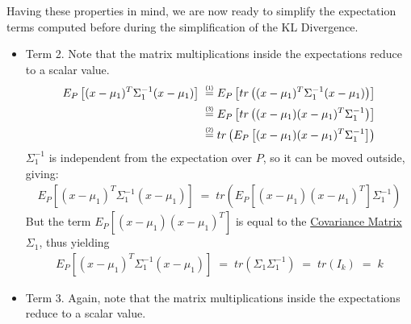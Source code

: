 \documentclass[12pt]{report}
\newcommand\prone{\mathrel{\overset{\makebox[0pt]{\mbox{\normalfont\tiny\sffamily (1)}}}{=}}}
\newcommand\prtwo{\mathrel{\overset{\makebox[0pt]{\mbox{\normalfont\tiny\sffamily (2)}}}{=}}}
\newcommand\prthr{\mathrel{\overset{\makebox[0pt]{\mbox{\normalfont\tiny\sffamily (3)}}}{=}}}
\begin{document}
\noindent Having these properties in mind, we are now ready to simplify the
expectation terms computed before during the simplification of the KL Divergence.

\begin{itemize}
    \item Term 2. Note that the matrix multiplications inside the expectations reduce
        to a scalar value.
        \begin{align*}
            E_P \left[ (x-\mu_1)^T\Sigma_1^{-1} (x - \mu_1) \right]
            \;\prone\;& E_P \left[ tr\left((x-\mu_1)^T\Sigma_1^{-1}
                (x - \mu_1)\right) \right] \\
            \;\prthr\;& E_P \left[ tr\left( (x - \mu_1)(x - \mu_1)^T
                \Sigma_1^{-1} \right) \right] \\
            \;\prtwo\;& tr\left( E_P\left[ (x - \mu_1)(x - \mu_1)^T
                \Sigma_1^{-1} \right] \right)
        \end{align*}
        $\Sigma_1^{-1}$ is independent from the expectation over $P$, so it can be moved
        outside, giving:
        \begin{align*}
            E_P \left[ (x-\mu_1)^T\Sigma_1^{-1} (x - \mu_1) \right] \;=\;
                tr\left( E_P\left[ (x - \mu_1)(x - \mu_1)^T
                    \right] \Sigma_1^{-1} \right)
        \end{align*}
        But the term $E_P\left[ (x - \mu_1)(x - \mu_1)^T \right]$ is equal to the
        \href{https://en.wikipedia.org/wiki/Covariance_matrix#Definition}
        {Covariance Matrix} $\Sigma_1$, thus yielding
        \begin{align*}
            E_P \left[ (x-\mu_1)^T\Sigma_1^{-1} (x - \mu_1) \right]
                \;=\; tr\left( \Sigma_1 \Sigma_1^{-1} \right) \;=\; tr(I_k) \;=\; k
        \end{align*}
    \item Term 3. Again, note that the matrix multiplications inside the expectations
        reduce to a scalar value.
\end{itemize}
\end{document}
